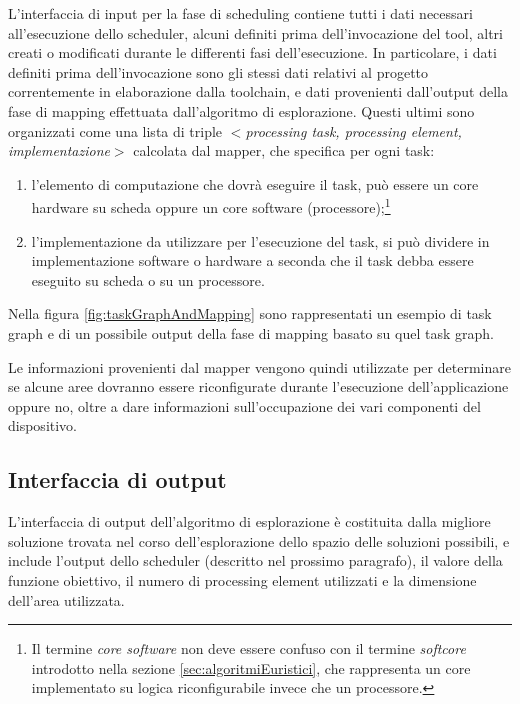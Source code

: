 L'interfaccia di input per la fase di scheduling contiene tutti i dati 
necessari all'esecuzione dello scheduler, alcuni definiti prima 
dell'invocazione del tool, altri creati o modificati durante le differenti fasi 
dell'esecuzione. In particolare, i dati definiti prima dell'invocazione sono
gli stessi dati relativi al progetto correntemente in elaborazione dalla toolchain,
e dati provenienti dall'output della fase di mapping effettuata dall'algoritmo di esplorazione.
Questi ultimi sono organizzati come una lista di triple \emph{$<$processing 
task, processing element, implementazione$>$} calcolata dal mapper, che 
specifica per ogni task:
\begin{enumerate}
 \item l'elemento di computazione che dovrà eseguire il task, può essere un 
core hardware su scheda oppure un core software (processore);\footnote{Il termine
\emph{core software} non deve essere confuso con il termine \emph{softcore} introdotto
nella sezione \ref{sec:algoritmiEuristici}, che rappresenta un core implementato su
logica riconfigurabile invece che un processore.}
 \item l'implementazione da utilizzare per l'esecuzione del task, si può 
dividere in implementazione software o hardware a seconda che il task debba 
essere eseguito su scheda o su un processore.
\end{enumerate}
Nella figura \ref{fig:taskGraphAndMapping} sono rappresentati un esempio di 
task graph e di un possibile output della fase di mapping basato su quel task graph.

Le informazioni provenienti dal mapper vengono quindi utilizzate per 
determinare se alcune aree dovranno essere riconfigurate durante l'esecuzione 
dell'applicazione oppure no, oltre a dare informazioni sull'occupazione dei 
vari componenti del dispositivo.


\subsection{Interfaccia di output}
L'interfaccia di output dell'algoritmo di esplorazione \`e costituita dalla
migliore soluzione trovata nel corso dell'esplorazione dello spazio delle soluzioni
possibili, e include l'output dello scheduler (descritto nel prossimo paragrafo),
il valore della funzione obiettivo, il numero di processing element utilizzati e
la dimensione dell'area utilizzata.


